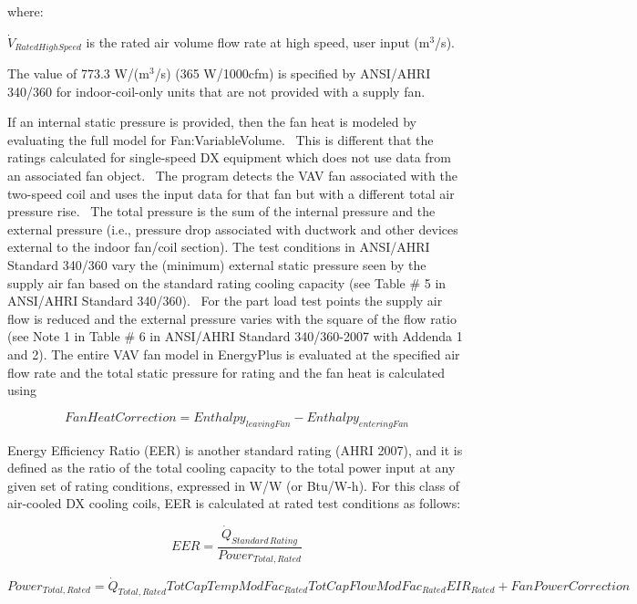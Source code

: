 where:

\({\dot V_{RatedHighSpeed}}\) is the rated air volume flow rate at high speed, user input (m\(^{3}\)/s).

The value of 773.3 W/(m\(^{3}\)/s) (365 W/1000cfm) is specified by ANSI/AHRI 340/360 for indoor-coil-only units that are not provided with a supply fan.

If an internal static pressure is provided, then the fan heat is modeled by evaluating the full model for Fan:VariableVolume.~ This is different that the ratings calculated for single-speed DX equipment which does not use data from an associated fan object.~ The program detects the VAV fan associated with the two-speed coil and uses the input data for that fan but with a different total air pressure rise.~ The total pressure is the sum of the internal pressure and the external pressure (i.e., pressure drop associated with ductwork and other devices external to the indoor fan/coil section). The test conditions in ANSI/AHRI Standard 340/360 vary the (minimum) external static pressure seen by the supply air fan based on the standard rating cooling capacity (see Table \# 5 in ANSI/AHRI Standard 340/360).~ For the part load test points the supply air flow is reduced and the external pressure varies with the square of the flow ratio (see Note 1 in Table \# 6 in ANSI/AHRI Standard 340/360-2007 with Addenda 1 and 2). The entire VAV fan model in EnergyPlus is evaluated at the specified air flow rate and the total static pressure for rating and the fan heat is calculated using

\begin{equation}
FanHeatCorrection = Enthalp{y_{leavingFan}} - Enthalp{y_{enteringFan}}
\end{equation}

Energy Efficiency Ratio (EER) is another standard rating (AHRI 2007), and it is defined as the ratio of the total cooling capacity to the total power input at any given set of rating conditions, expressed in W/W (or Btu/W-h). For this class of air-cooled DX cooling coils, EER is calculated at rated test conditions as follows:

\begin{equation}
  EER = \frac{{\dot Q}_{Standard\,Rating}}{Power_{Total,Rated}}
\end{equation}

\begin{equation}
    Power_{Total,Rated} = \dot{Q}_{Total,Rated} TotCapTempModFac_{Rated} TotCapFlowModFac_{Rated} EIR_{Rated} + FanPowerCorrection
\end{equation}


